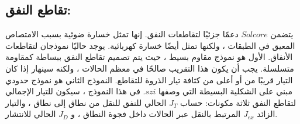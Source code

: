 \subsection{تقاطع النفق:}
يتضمن $ Solcore $ دعمًا جزئيًا لتقاطعات النفق. إنها تمثل خسارة ضوئية بسبب الامتصاص المعيق في الطبقات ، ولكنها تمثل أيضًا خسارة كهربائية. يوجد حاليًا نموذجان لتقاطعات الأنفاق. الأول هو نموذج مقاوم بسيط ، حيث يتم تصميم تقاطع النفق ببساطة كمقاومة متسلسلة. يجب أن يكون هذا التقريب صالحًا في معظم الحالات ، ولكنه سينهار إذا كان التيار قريبًا من أو أعلى من كثافة تيار الذروة للتقاطع.
النموذج الثاني هو نموذج حدودي مبني على الشكلية البسيطة التي وصفها $ szi $. في هذا النموذج ، سيكون للتيار الإجمالي لتقاطع النفق ثلاثة مكونات: حساب $ J_T $ الحالي للنفق للنقل من نطاق إلى نطاق ، والتيار الزائد $ J_{ex} $ المرتبط بالنقل عبر الحالات داخل فجوة النطاق ، و $ J_D $ الحالي للانتشار.



















